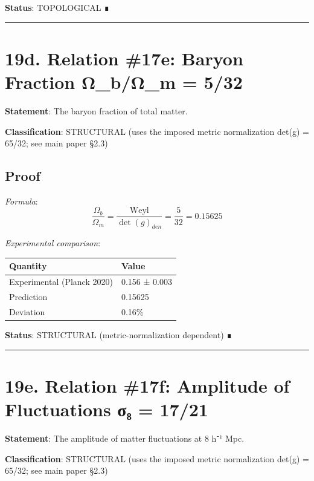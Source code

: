 \documentclass[11pt,a4paper]{article}
\begin{document}
\textbf{Status}: TOPOLOGICAL ∎

\begin{center}\rule{\linewidth}{0.5pt}\end{center}

\section{19d. Relation \#17e: Baryon Fraction Ω\_\allowbreak{}b/Ω\_\allowbreak{}m = 5/32}\label{d.-relation-17e-baryon-fraction-ux3c9_bux3c9_m-532}

\textbf{Statement}: The baryon fraction of total matter.

\textbf{Classification}: STRUCTURAL (uses the imposed metric normalization det(g) = 65/32; see main paper §2.3)

\subsection{Proof}\label{proof-24}

\emph{Formula}: \[\frac{\Omega_b}{\Omega_m} = \frac{\text{Weyl}}{\det(g)_{den}} = \frac{5}{32} = 0.15625\]

\emph{Experimental comparison}:

\begin{longtable}[]{@{}ll@{}}
\toprule\noalign{}
Quantity & Value \\
\midrule\noalign{}
\endhead
\bottomrule\noalign{}
\endlastfoot
Experimental (Planck 2020) & 0.156 ± 0.003 \\
Prediction & 0.15625 \\
Deviation & 0.16\% \\
\end{longtable}

\textbf{Status}: STRUCTURAL (metric-normalization dependent) ∎

\begin{center}\rule{\linewidth}{0.5pt}\end{center}

\section{19e. Relation \#17f: Amplitude of Fluctuations σ₈ = 17/21}\label{e.-relation-17f-amplitude-of-fluctuations-ux3c3ux2088-1721}

\textbf{Statement}: The amplitude of matter fluctuations at 8 h⁻¹ Mpc.

\textbf{Classification}: STRUCTURAL (uses the imposed metric normalization det(g) = 65/32; see main paper §2.3)
\end{document}

